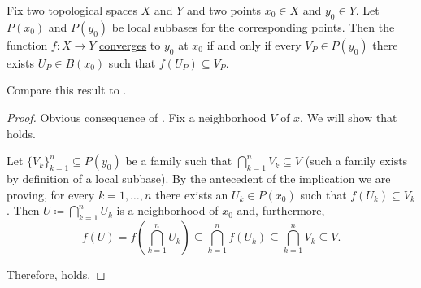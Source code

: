 \begin{proposition}\label{thm:cauchy_function_convergence_via_subbases}
  Fix two topological spaces \( X \) and \( Y \) and two points \( x_0 \in X \) and \( y_0 \in Y \). Let \( P(x_0) \) and \( P(y_0) \) be local \hyperref[def:topological_local_subbase]{subbases} for the corresponding points. Then the function \( f: X \to Y \) \hyperref[def:local_convergence]{converges} to \( y_0 \) at \( x_0 \) if and only if every \( V_P \in P(y_0) \) there exists \( U_P \in B(x_0) \) such that \( f(U_P) \subseteq V_P \).

  Compare this result to .
\end{proposition}
\begin{proof}
  \SufficiencySubProof Obvious consequence of .
  \NecessitySubProof Fix a neighborhood \( V \) of \( x \). We will show that  holds.

  Let \( \{ V_k \}_{k=1}^n \subseteq P(y_0) \) be a family such that \( \bigcap_{k=1}^n V_k \subseteq V \) (such a family exists by definition of a local subbase). By the antecedent of the implication we are proving, for every \( k = 1, \ldots, n \) there exists an \( U_k \in P(x_0) \) such that \( f(U_k) \subseteq V_k \). Then \( U \coloneqq \bigcap_{k=1}^n U_k \) is a neighborhood of \( x_0 \) and, furthermore,
  \begin{equation*}
    f(U)
    =
    f\left(\bigcap_{k=1}^n U_k \right)
    \subseteq
    \bigcap_{k=1}^n f(U_k)
    \subseteq
    \bigcap_{k=1}^n V_k
    \subseteq
    V.
  \end{equation*}

  Therefore,  holds.
\end{proof}
